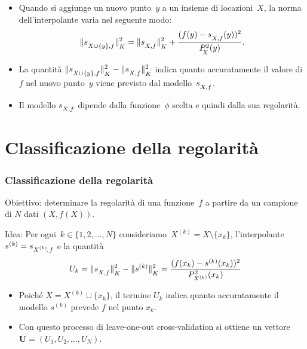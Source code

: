 \documentclass[10pt]{beamer}
\theoremstyle{definition}
\theoremstyle{plain}
\def\norm#1{\Vert #1\Vert}
\def\lK{{\lower.5ex\hbox{$\scriptstyle K$}}}
\def\lX{{\!\!\lower.5ex\hbox{$\scriptstyle X$}}}
\def\lXf{{\lower.5ex\hbox{$\scriptstyle X, f$}}}
\def\lXyf{{\lower.5ex\hbox{$\scriptstyle X\cup\{y\}, f$}}}
\begin{document}
\begin{frame}
\begin{itemize}
\item
 Quando si aggiunge un nuovo punto~$y$ a un insieme di locazioni~$X$, la norma dell’interpolante varia nel seguente modo:
$$
\norm{s_\lXyf}^2_\lK = \norm{s_\lXf}^2_\lK + \frac{(f(y) - s_\lXf(y))^2}{P^2_\lX(y)}.
$$
\item
La quantità $\norm{s_\lXyf}^2_\lK - \norm{s_\lXf}^2_\lK$ indica quanto accuratamente il valore di $f$ nel nuovo punto~$y$ viene previsto dal modello~$s_\lXf$.

\item
Il modello $s_\lXf$ dipende dalla funzione~$\phi$ scelta e quindi dalla sua regolarità.  
\end{itemize}
\end{frame}



\section{Classificazione della regolarità}
\begin{frame}
\frametitle{Classificazione della regolarità}
\alert{Obiettivo}: determinare la regolarità di una funzione~$f$ a partire da un campione di $N$ dati $(X, f(X))$.
\bigskip

\alert{Idea}: Per ogni~$k\in\{1,2,\dots, N\}$ consideriamo~$X^{(k)} = X\setminus \{x_k\}$, l’interpolante $s^{(k)} = s_{\hbox{$\scriptstyle X^{(k)}\!,\, f$}}$ e la quantità
$$
U_k = \norm{s_\lXf}^2_\lK - \norm{s^{(k)}}^2_\lK = \frac{(f(x_k) - s^{(k)}(x_k))^2}{P^2_{X^{(k)}}(x_k)}
$$
\begin{itemize}
\item
Poiché $X=X^{(k)}\cup\{x_k\}$, il termine $U_k$
indica quanto accuratamente il modello $s^{(k)}$ prevede $f$ nel punto $x_k$.
\item
Con questo processo di \alert{leave-one-out cross-validation} si ottiene  un vettore $\bm U = (U_1,U_2,\dots, U_N)$.
\end{itemize}
\end{frame}
\end{document}

